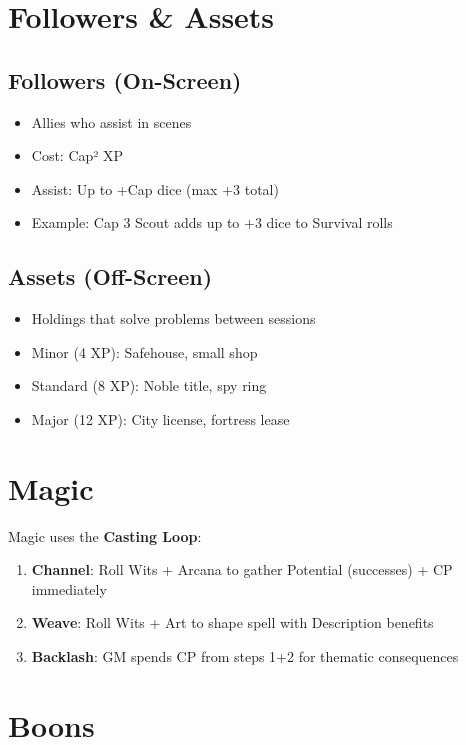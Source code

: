 \documentclass[11pt]{article}
\begin{document}
\section{Followers \& Assets}

\subsection{Followers (On-Screen)}
\begin{itemize}
    \item Allies who assist in scenes
    \item Cost: Cap² XP
    \item Assist: Up to +Cap dice (max +3 total)
    \item Example: Cap 3 Scout adds up to +3 dice to Survival rolls
\end{itemize}

\subsection{Assets (Off-Screen)}
\begin{itemize}
    \item Holdings that solve problems between sessions
    \item Minor (4 XP): Safehouse, small shop
    \item Standard (8 XP): Noble title, spy ring
    \item Major (12 XP): City license, fortress lease
\end{itemize}

\section{Magic}

Magic uses the \textbf{Casting Loop}:

\begin{enumerate}
    \item \textbf{Channel}: Roll Wits + Arcana to gather Potential (successes) + CP immediately
    \item \textbf{Weave}: Roll Wits + Art to shape spell with Description benefits
    \item \textbf{Backlash}: GM spends CP from steps 1+2 for thematic consequences
\end{enumerate}

\section{Boons}
\end{document}
